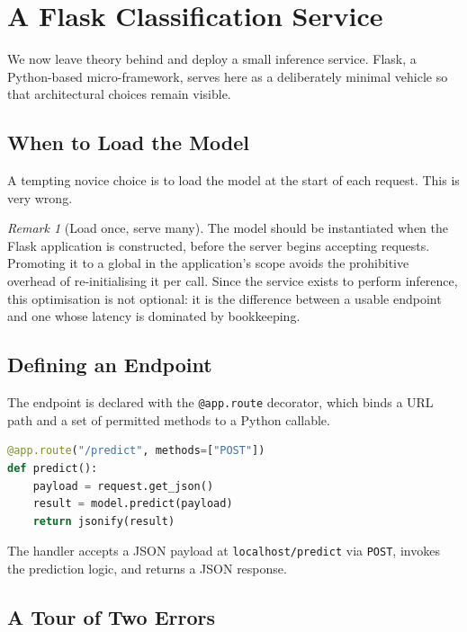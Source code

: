 \documentclass[11pt,a4paper]{article}
\theoremstyle{definition}
\theoremstyle{remark}
\newtheorem*{remark}{Remark}
\begin{document}
\section{A Flask Classification Service}

We now leave theory behind and deploy a small inference service. Flask, a Python-based micro-framework, serves here as a deliberately minimal vehicle so that architectural choices remain visible.

\subsection{When to Load the Model}

A tempting novice choice is to load the model at the start of each request. This is very wrong.

\begin{remark}[Load once, serve many]
The model should be instantiated when the Flask application is constructed, before the server begins accepting requests. Promoting it to a global in the application's scope avoids the prohibitive overhead of re-initialising it per call. Since the service exists to perform inference, this optimisation is not optional: it is the difference between a usable endpoint and one whose latency is dominated by bookkeeping.
\end{remark}

\subsection{Defining an Endpoint}

The endpoint is declared with the \texttt{@app.route} decorator, which binds a URL path and a set of permitted methods to a Python callable.

\begin{lstlisting}[language=Python]
@app.route("/predict", methods=["POST"])
def predict():
    payload = request.get_json()
    result = model.predict(payload)
    return jsonify(result)
\end{lstlisting}

The handler accepts a JSON payload at \texttt{localhost/predict} via \texttt{POST}, invokes the prediction logic, and returns a JSON response.

\subsection{A Tour of Two Errors}
\end{document}
